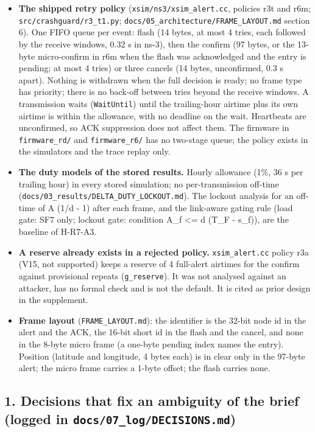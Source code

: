 \begin{itemize}
\item \textbf{The shipped retry policy} (\texttt{xsim/ns3/xsim\_alert.cc}, policies r3t and r6m; \texttt{src/crashguard/r3\_t1.py}; \texttt{docs/05\_architecture/FRAME\_LAYOUT.md} section 6). One FIFO queue per event: flash (14 bytes, at most 4 tries, each followed by the receive windows, 0.32 s in ns-3), then the confirm (97 bytes, or the 13-byte micro-confirm in r6m when the flash was acknowledged and the entry is pending; at most 4 tries) or three cancels (14 bytes, unconfirmed, 0.3 s apart). Nothing is withdrawn when the full decision is ready; no frame type has priority; there is no back-off between tries beyond the receive windows. A transmission waits (\texttt{WaitUntil}) until the trailing-hour airtime plus its own airtime is within the allowance, with no deadline on the wait. Heartbeats are unconfirmed, so ACK suppression does not affect them. The firmware in \texttt{firmware\_rd/} and \texttt{firmware\_r6/} has no two-stage queue; the policy exists in the simulators and the trace replay only.
\item \textbf{The duty models of the stored results.} Hourly allowance (1\%, 36 s per trailing hour) in every stored simulation; no per-transmission off-time (\texttt{docs/03\_results/DELTA\_DUTY\_LOCKOUT.md}). The lockout analysis for an off-time of A (1/d - 1) after each frame, and the link-aware gating rule (load gate: SF7 only; lockout gate: condition A\_f <= d (T\_F - s\_f)), are the baseline of H-R7-A3.
\item \textbf{A reserve already exists in a rejected policy.} \texttt{xsim\_alert.cc} policy r3a (V15, not supported) keeps a reserve of 4 full-alert airtimes for the confirm against provisional repeats (\texttt{g\_reserve}). It was not analysed against an attacker, has no formal check and is not the default. It is cited as prior design in the supplement.
\item \textbf{Frame layout} (\texttt{FRAME\_LAYOUT.md}): the identifier is the 32-bit node id in the alert and the ACK, the 16-bit short id in the flash and the cancel, and none in the 8-byte micro frame (a one-byte pending index names the entry). Position (latitude and longitude, 4 bytes each) is in clear only in the 97-byte alert; the micro frame carries a 1-byte offset; the flash carries none.
\end{itemize}

\subsection*{1. Decisions that fix an ambiguity of the brief (logged in \texttt{docs/07\_log/DECISIONS.md})}

